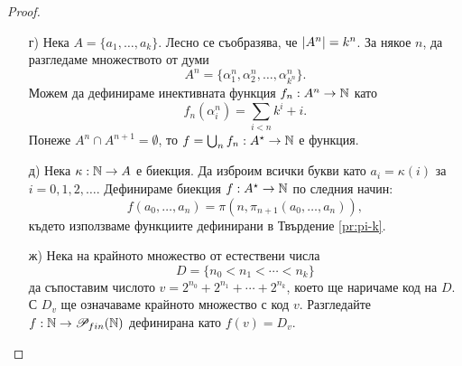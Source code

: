 \begin{proof}
  \begin{enumerate}[a)]
  \item[г)]
    Нека $A = \{a_1,\dots,a_k\}$.
    Лесно се съобразява, че $\lvert{A^n}\rvert = k^n$.
    За някое $n$, да разгледаме множеството от думи 
    \[A^n = \{\alpha^n_{1},\alpha^n_{2},\dots, \alpha^n_{{k^n}}\}.\]
    Можем да дефинираме инективната функция $f_n : A^n \to \mathbb{N}$ като
    \[f_n(\alpha^n_{i}) = \sum_{i<n} k^i + i.\]
    Понеже $A^n \cap A^{n+1} = \emptyset$, 
    то $f = \bigcup_n f_n : A^\star \to \mathbb{N}$ е функция.
  \item[д)]
    Нека $\kappa:\mathbb{N} \to A$ е биекция.
    Да изброим всички букви като $a_i = \kappa(i)$ за $i = 0,1,2,\dots$.
    Дефинираме биекция $f:A^\star \to \mathbb{N}$ по следния начин:
    \[f(a_0,\dots,a_n) = \pi(n, \pi_{n+1}(a_0,\dots,a_n)),\]
    където използваме функциите дефинирани в Твърдение \ref{pr:pi-k}.
  \item[ж)]
    Нека на крайното множество от естествени числа
    \[D = \{n_0 < n_1 < \cdots < n_k\}\]
    да съпоставим числото $v = 2^{n_0} + 2^{n_1} + \cdots + 2^{n_k}$, което ще наричаме код на $D$.
    С $D_v$ ще означаваме крайното множество с код $v$.
    Разгледайте $f:\mathbb{N} \to \mathscr{P}_{fin}(\mathbb{N})$ дефинирана като
    $f(v) = D_v$.
  \end{enumerate}
\end{proof}

